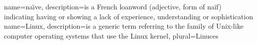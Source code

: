 {
  name=na\"{\i}ve,
  description={is a French loanword (adjective, form of naïf)
               indicating having or showing a lack of experience,
               understanding or sophistication}
}
{
  name=Linux,
  description={is a generic term referring to the family of Unix-like
               computer operating systems that use the Linux kernel},
  plural=Linuces
}